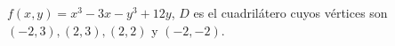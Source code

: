 \item $f(x, y) = x^3 - 3x - y^3 + 12y$, $D$ es el cuadrilátero cuyos vértices son $(-2, 3), (2, 3), (2, 2)$ y $(-2, -2)$.
